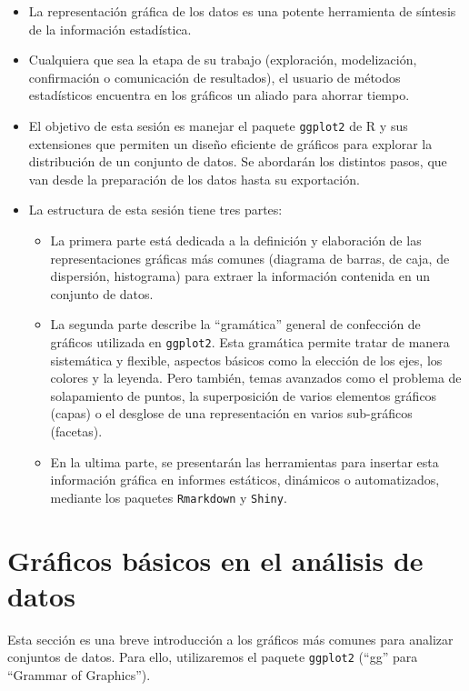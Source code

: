 \documentclass[]{article}
\providecommand{\tightlist}{%
  \setlength{\itemsep}{0pt}\setlength{\parskip}{0pt}}
\numberwithin{ejcnt}{section}
\begin{document}
\begin{itemize}
\item
  La representación gráfica de los datos es una potente herramienta de síntesis de la información estadística.
\item
  Cualquiera que sea la etapa de su trabajo (exploración, modelización, confirmación o comunicación de resultados), el usuario de métodos estadísticos encuentra en los gráficos un aliado para ahorrar tiempo.
\item
  El objetivo de esta sesión es manejar el paquete \texttt{ggplot2} de R y sus extensiones que permiten un diseño eficiente de gráficos para explorar la distribución de un conjunto de datos. Se abordarán los distintos pasos, que van desde la preparación de los datos hasta su exportación.
\item
  La estructura de esta sesión tiene tres partes:

  \begin{itemize}
  \tightlist
  \item
    La primera parte está dedicada a la definición y elaboración de las representaciones gráficas más comunes (diagrama de barras, de caja, de dispersión, histograma) para extraer la información contenida en un conjunto de datos.
  \item
    La segunda parte describe la ``gramática'' general de confección de gráficos utilizada en \texttt{ggplot2}. Esta gramática permite tratar de manera sistemática y flexible, aspectos básicos como la elección de los ejes, los colores y la leyenda. Pero también, temas avanzados como el problema de solapamiento de puntos, la superposición de varios elementos gráficos (capas) o el desglose de una representación en varios sub-gráficos (facetas).
  \item
    En la ultima parte, se presentarán las herramientas para insertar esta información gráfica en informes estáticos, dinámicos o automatizados, mediante los paquetes \texttt{Rmarkdown} y \texttt{Shiny}.
  \end{itemize}
\end{itemize}

\hypertarget{graficos-basicos-en-el-analisis-de-datos}{%
\section{Gráficos básicos en el análisis de datos}\label{graficos-basicos-en-el-analisis-de-datos}}

Esta sección es una breve introducción a los gráficos más comunes para analizar conjuntos de datos. Para ello, utilizaremos el paquete \texttt{ggplot2} (``gg'' para ``Grammar of Graphics'').
\end{document}
